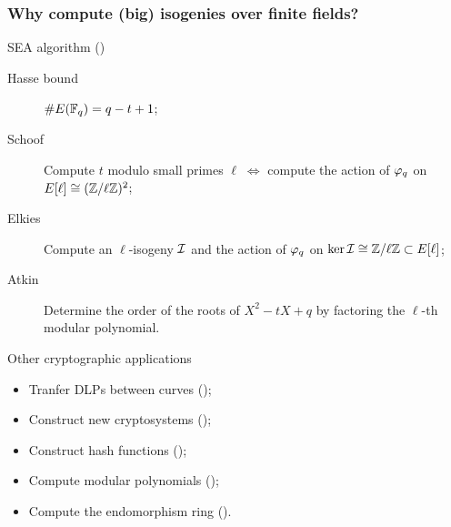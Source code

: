 \documentclass[10pt,usepdftitle=false]{beamer}
\begin{document}

\begin{frame}
  \frametitle{Why compute (big) isogenies over finite fields?}
  
  \begin{block}{SEA algorithm (\cite{schoof95,elkies98,atkin88})}
    \begin{description}
    \item[Hasse bound] \hfill{\large\emph{$\# E(\mathbb{F}_q)= q-t+1$}};\hfill\strut
    \item[Schoof] Compute $t$ modulo small primes
      $\ell\;\Leftrightarrow$ compute the action of $\varphi_q$ on
      \emph{$E[\ell]\cong(\mathbb{Z}/\ell\mathbb{Z})^2$};
    \item[Elkies] Compute an $\ell$-isogeny $\mathcal{I}$ and the action of
      $\varphi_q$ on \emph{$\ker\mathcal{I}\cong\mathbb{Z}/\ell\mathbb{Z}\subset E[\ell]$};
    \item[Atkin] Determine the order of the roots of $X^2 -tX +q$ by
      factoring the $\ell$-th modular polynomial.
    \end{description}
  \end{block}

  \begin{block}{Other cryptographic applications}
    \begin{itemize}
    \item Tranfer DLPs between curves (\cite{gaudry+hess+smart02,smith09});
    \item Construct new cryptosystems (\cite{teske06,rostovtsev+stolbunov06});
    \item Construct hash functions (\cite{charles+lauter+goren09});
    \item Compute modular polynomials (\cite{sutherland10:modpol});
    \item Compute the endomorphism ring (\cite{kohel,sutherland10:hilbert}).
    \end{itemize}
  \end{block}
\end{frame}

\end{document}
